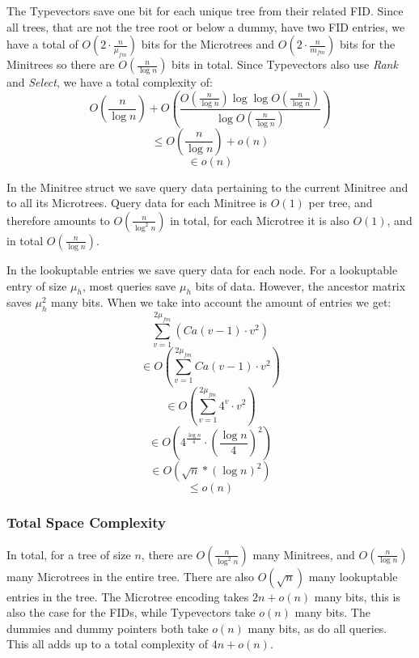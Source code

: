 \documentclass{article}
\begin{document}
The Typevectors save one bit for each unique tree from their related FID. Since all trees, that are not the tree root or below a dummy, have two FID entries, we have a total of $O(2 \cdot \frac{n}{\mu_{fm}})$ bits for the Microtrees and $O(2 \cdot \frac{n}{m_{fm}})$ bits for the Minitrees so there are $O(\frac{n}{\log n})$ bits in total. Since Typevectors also use \textit{Rank} and \textit{Select}, we have a total complexity of:
$$O \left( \frac{n}{\log n}\right) + O\left( \frac{ O \left( \frac{n}{\log n}\right) \log \log O \left( \frac{n}{\log n}\right)}{\log O \left( \frac{n}{\log n}\right)} \right)$$
$$\leq O \left( \frac{n}{\log n}\right) + o(n)$$
$$\in o(n)$$

In the Minitree struct we save query data pertaining to the current Minitree and to all its Microtrees. Query data for each Minitree is $O(1)$ per tree, and therefore amounts to $O(\frac{n}{\log ^{2} n})$ in total, for each Microtree it is also $O(1)$, and in total $O(\frac{n}{\log {n}})$.

In the lookuptable entries we save query data for each node. For a lookuptable entry of size $\mu_{h}$, most queries save $\mu_{h}$ bits of data. However, the ancestor matrix saves $\mu_{h}^{2}$ many bits. When we take into account the amount of entries we get:
$$\sum_{v=1}^{2\mu_{fm}} \left( Ca(v-1) \cdot v^{2} \right)$$
$$\in O\left( \sum_{v=1}^{2\mu_{fm}} Ca(v-1) \cdot v^{2} \right)$$
$$\in O\left( \sum_{v=1}^{2\mu_{fm}} 4^{v} \cdot v^{2} \right)$$
$$\in O \left( 4^{\frac{\log n}{4}} \cdot \left( \frac{\log n}{4} \right)^{2} \right)$$
$$\in O(\sqrt{n} * (\log n)^{2})$$
$$\leq o(n)$$ %

\subsubsection{Total Space Complexity} \label{Total Space Complexity}
In total, for a tree of size $n$, there are $O(\frac{n}{\log ^{2} n})$ many Minitrees, and $O(\frac{n}{\log {n}})$ many Microtrees in the entire tree. There are also $O(\sqrt{n})$ many lookuptable entries in the tree. The Microtree encoding takes $2n + o(n)$ many bits, this is also the case for the FIDs, while Typevectors take $o(n)$ many bits. The dummies and dummy pointers both take $o(n)$ many bits, as do all queries.\\
This all adds up to a total complexity of $4n + o(n)$.
\end{document}
